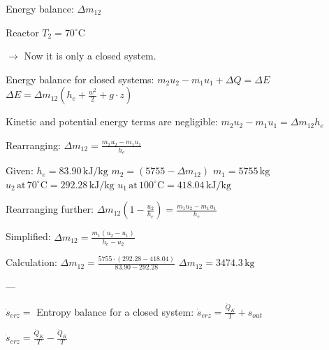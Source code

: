 Energy balance: \( \Delta m_{12} \)  

Reactor \( T_2 = 70^\circ \text{C} \)  

\(\rightarrow\) Now it is only a closed system.  

Energy balance for closed systems:  
\( m_2 u_2 - m_1 u_1 + \Delta Q = \Delta E \)  
\( \Delta E = \Delta m_{12} (h_e + \frac{w^2}{2} + g \cdot z) \)  

Kinetic and potential energy terms are negligible:  
\( m_2 u_2 - m_1 u_1 = \Delta m_{12} h_e \)  

Rearranging:  
\( \Delta m_{12} = \frac{m_2 u_2 - m_1 u_1}{h_e} \)  

Given:  
\( h_e = 83.90 \, \text{kJ/kg} \)  
\( m_2 = (5755 - \Delta m_{12}) \)  
\( m_1 = 5755 \, \text{kg} \)  
\( u_2 \, \text{at} \, 70^\circ \text{C} = 292.28 \, \text{kJ/kg} \)  
\( u_1 \, \text{at} \, 100^\circ \text{C} = 418.04 \, \text{kJ/kg} \)  

Rearranging further:  
\( \Delta m_{12} (1 - \frac{u_2}{h_e}) = \frac{m_1 u_2 - m_1 u_1}{h_e} \)  

Simplified:  
\( \Delta m_{12} = \frac{m_1 (u_2 - u_1)}{h_e - u_2} \)  

Calculation:  
\( \Delta m_{12} = \frac{5755 \cdot (292.28 - 418.04)}{83.90 - 292.28} \)  
\( \Delta m_{12} = 3474.3 \, \text{kg} \)  

---

\( \dot{s}_{erz} = \) Entropy balance for a closed system:  
\( \dot{s}_{erz} = \frac{\dot{Q}_K}{T} + s_{out} \)  

\( \dot{s}_{erz} = \frac{\dot{Q}_K}{T} - \frac{\dot{Q}_K}{T} \)